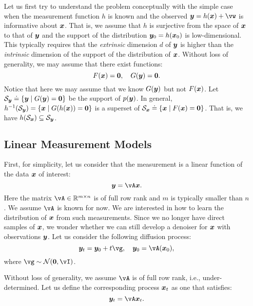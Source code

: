 \documentclass[../../book-main.tex]{subfiles}
\begin{document}
Let us first try to understand the problem conceptually with the simple case when the measurement function $h$ is known and the observed $\y = h(\x) + \vw$ is informative about $\bm{x}$. That is, we assume that $h$ is surjective from the space of $\bm{x}$ to that of $\bm{y}$ and the support of the distribution $\bm{y}_0 = h(\bm{x}_0)$ is low-dimensional. This typically requires that the \textit{extrinsic} dimension $d$ of $\bm{y}$ is higher than the \textit{intrinsic} dimension of the support of the distribution of $\bm{x}$. Without loss of generality, we may assume that there exist functions:
\begin{equation}
F(\bm{x}) = \boldsymbol{0},\quad     G(\bm{y}) = \boldsymbol{0}.
\end{equation}
Notice that here we may assume that we know $G(\bm{y})$ but not $F(\bm{x})$. Let $\mathcal{S}_{\bm{y}} \doteq \{\bm{y} \mid G(\bm{y}) = \boldsymbol{0}\}$ be the support of $p(\bm{y})$.  In general, $h^{-1}(\mathcal{S}_{\bm{y}}) = \{\bm{x} \mid G(h(\bm{x})) = \boldsymbol{0}\}$ is a superset of $\mathcal{S}_{\bm{x}} \doteq \{\bm{x} \mid F(\bm{x}) = \boldsymbol{0}\}$. That is, we have $h(\mathcal{S}_{\bm{x}}) \subseteq \mathcal{S}_{\bm{y}}$.



\subsection{Linear Measurement Models}
First, for simplicity, let us consider that the measurement is a linear function of the data $\bm{x}$ of interest:
\begin{equation}
    \y = \vA\x.
\end{equation}
Here the matrix $\vA \in \mathbb{R}^{m\times n}$ is of full row rank and $m$ is typically smaller than $n$. We assume $\vA$ is known for now. We are interested in how to learn the distribution of $\bm{x}$ from such measurements. Since we no longer have direct samples of $\bm{x}$, we wonder whether we can still develop a denoiser for $\bm{x}$ with observations $\bm{y}$. Let us consider the following diffusion process:
\begin{equation}
    \y_t = \y_0 + t \vg, \quad \y_0 = \vA(\x_0), 
\end{equation}
where $\vg \sim \mathcal{N}(\boldsymbol{0}, \vI)$. 



Without loss of generality, we assume $\vA$ is of full row rank, i.e., under-determined. Let us define the corresponding process $\bm{x}_t$ as one that satisfies:
\begin{equation}
\y_t = \vA \x_t.   
\end{equation}
\end{document}

